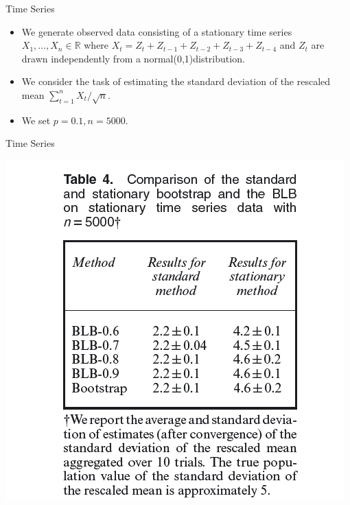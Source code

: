 \documentclass[12pt]{beamer}
\begin{document}
\begin{frame}{Time Series}
\begin{itemize}
\item We generate observed data consisting of a stationary time series 
$X_1,\dots,X_n\in \mathbb{R}$ where $X_t=Z_t+Z_{t-1}+Z_{t-2}+Z_{t-3}+Z_{t-4}$ and $Z_t$ are drawn independently from a normal(0,1)distribution.
\item We consider the task of estimating the standard deviation of the rescaled mean $\sum_{t=1}^n X_t/\sqrt{n}$.
\item We set $p=0.1, n=5000$.
\end{itemize}
\end{frame}
\begin{frame}{Time Series}
\begin{center}
\includegraphics[scale=1]{table4.png} 
\end{center}
\end{frame}
\end{document}
